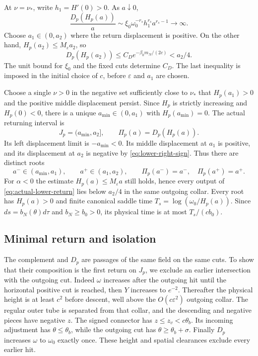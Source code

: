 At $\nu=\nu_*$, write $h_1=H'(0)>0$. As $a\downarrow0$,
\begin{equation}\label{eq:homoclinic-positive-displacement}
 \frac{D_p(H_p(a))}{a}
 \sim \xi_0\omega_0^{-r_s}h_1^{r_s}a^{r_s-1}
 \longrightarrow\infty .
\end{equation}
Choose $a_1\in(0,a_2)$ where the return displacement is positive.
On the other hand, $H_p(a_2)\le M_\varepsilon a_2$, so
\begin{equation}\label{eq:lower-right-sign}
 D_p(H_p(a_2))
 \le C_D e^{-\beta_0m_N/(2c)}<a_2/4 .
\end{equation}
The unit bound for $\xi_0$ and the fixed cuts determine $C_D$.
The last inequality is imposed in the initial choice of $c$, before
$\varepsilon$ and $a_1$ are chosen.

Choose a single $\nu>0$ in the negative set sufficiently close
to $\nu_*$ that $H_p(a_1)>0$ and the positive middle displacement
persist. Since $H_p$ is strictly increasing and $H_p(0)<0$,
there is a unique $a_{\min}\in(0,a_1)$ with $H_p(a_{\min})=0$.
The actual returning interval is
\begin{equation}\label{eq:actual-lower-return}
 J_p=(a_{\min},a_2],\qquad
 \Pi_p(a)=D_p(H_p(a)).
\end{equation}
Its left displacement limit is $-a_{\min}<0$. Its middle
displacement at $a_1$ is positive, and its displacement at $a_2$
is negative by \eqref{eq:lower-right-sign}. Thus there are distinct
roots
\begin{equation}\label{eq:two-return-roots}
 a^-\in(a_{\min},a_1),\qquad a^+\in(a_1,a_2),\qquad
 \Pi_p(a^-)=a^-,\quad\Pi_p(a^+)=a^+ .
\end{equation}
For $\alpha<0$ the estimate $H_p(a)\le M_\varepsilon a$
still holds, hence every output of \eqref{eq:actual-lower-return}
lies below $a_2/4$ in the same outgoing collar.
Every root has $H_p(a)>0$ and finite canonical saddle time
$T_s=\log(\omega_0/H_p(a))$.
Since $ds=b_N(\theta)d\tau$ and $b_N\ge b_0>0$, its physical
time is at most $T_s/(cb_0)$.

\subsection{Minimal return and isolation}
The complement and $D_p$ are passages of the same field on the
same cuts. To show that their composition is the first return on
$J_p$, we exclude an earlier intersection with the outgoing cut.
Indeed $\omega$ increases after the outgoing hit until the
horizontal positive cut is reached, then $Y$ increases to $e^{-2}$.
Thereafter the physical height is at least $c^2$ before descent,
well above the $O(c\varepsilon^2)$ outgoing collar.
The regular outer tube is separated from that collar, and the
descending and negative pieces have negative $z$. The signed
connector has $z\le z_v<c\theta_b$. Its incoming adjustment
has $\theta\le\theta_b$, while the outgoing cut has
$\theta\ge\theta_b+\sigma$. Finally $D_p$ increases $\omega$
to $\omega_0$ exactly once. These height and spatial clearances
exclude every earlier hit.

